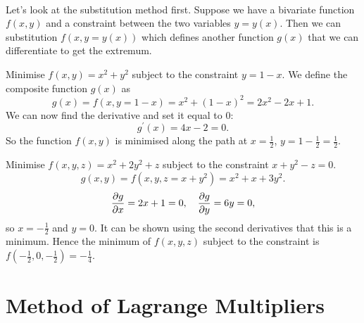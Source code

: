 \documentclass[../multivariate_calculus.tex]{subfiles}
\begin{document}
        \paragraph{}
        Let's look at the substitution method first.
        Suppose we have a bivariate function $f(x,y)$ and a constraint between the two variables $y=y(x)$.
        Then we can substitution $f(x,y=y(x))$ which defines another function $g(x)$ that we can differentiate to get the extremum.
        \begin{example}
            Minimise $f(x,y)=x^2+y^2$ subject to the constraint $y=1-x$.
            We define the composite function $g(x)$ as
            \begin{equation}
                g(x)=f(x,y=1-x)=x^2+(1-x)^2=2x^2-2x+1.
            \end{equation}
            We can now find the derivative and set it equal to 0:
            \begin{equation}
                g^\prime(x)=4x-2=0.
            \end{equation}
            So the function $f(x,y)$ is minimised along the path at $x=\frac{1}{2}$, $y=1-\frac{1}{2}=\frac{1}{2}$.
        \end{example}
        \begin{example}
            Minimise $f(x,y,z)=x^2+2y^2+z$ subject to the constraint $x+y^2-z=0$.
            \begin{equation}
                g(x,y)=f(x,y,z=x+y^2)=x^2+x+3y^2.
            \end{equation}
            \begin{equation}
                \frac{\partial g}{\partial x}=2x+1=0,\quad\frac{\partial g}{\partial y}=6y=0,
            \end{equation}
            so $x=-\frac{1}{2}$ and $y=0$. 
            It can be shown using the second derivatives that this is a minimum.
            Hence the minimum of $f(x,y,z)$ subject to the constraint is $f(-\frac{1}{2},0,-\frac{1}{2})=-\frac{1}{4}$.
        \end{example}

    \section{Method of Lagrange Multipliers}
\end{document}
